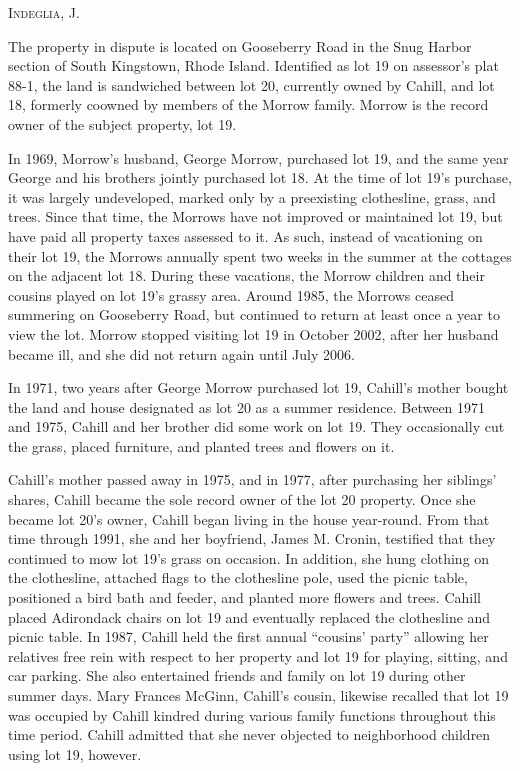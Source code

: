 
\opinion \textsc{Indeglia}, J.

The property in dispute is located on Gooseberry Road in the Snug Harbor section
of South Kingstown, Rhode Island. Identified as lot 19 on assessor's plat 88-1,
the land is sandwiched between lot 20, currently owned by Cahill, and lot 18,
formerly coowned by members of the Morrow family. Morrow is the record owner of
the subject property, lot 19.

In 1969, Morrow's husband, George Morrow, purchased lot 19, and the same year
George and his brothers jointly purchased lot 18. At the time of lot 19's
purchase, it was largely undeveloped, marked only by a preexisting clothesline,
grass, and trees. Since that time, the Morrows have not improved or maintained
lot 19, but have paid all property taxes assessed to it. As such, instead of
vacationing on their lot 19, the Morrows annually spent two weeks in the summer
at the cottages on the adjacent lot 18. During these vacations, the Morrow
children and their cousins played on lot 19's grassy area. Around 1985, the
Morrows ceased summering on Gooseberry
Road, but continued to return at least once a year
to view the lot. Morrow stopped visiting lot 19 in October 2002, after her
husband became ill, and she did not return again until July 2006.

In 1971, two years after George Morrow purchased lot 19, Cahill's mother bought
the land and house designated as lot 20 as a summer residence. Between 1971 and
1975, Cahill and her brother did some work on lot 19. They occasionally cut the
grass, placed furniture, and planted trees and flowers on it.

Cahill's mother passed away in 1975, and in 1977, after purchasing her siblings'
shares, Cahill became the sole record owner of the lot 20 property. Once she
became lot 20's owner, Cahill began living in the house year-round. From that
time through 1991, she and her boyfriend, James M. Cronin, testified that they
continued to mow lot 19's grass on occasion. In addition, she hung clothing on
the clothesline, attached flags to the clothesline pole, used the picnic table,
positioned a bird bath and feeder, and planted more flowers and trees. Cahill
placed Adirondack chairs on lot 19 and eventually replaced the clothesline and
picnic table. In 1987, Cahill held the first annual ``cousins' party'' allowing
her relatives free rein with respect to her property and lot 19 for playing,
sitting, and car parking. She also entertained friends and family on lot 19
during other summer days. Mary Frances McGinn, Cahill's cousin, likewise
recalled that lot 19 was occupied by Cahill kindred during various family
functions throughout this time period. Cahill admitted that she never objected
to neighborhood children using lot 19, however.

